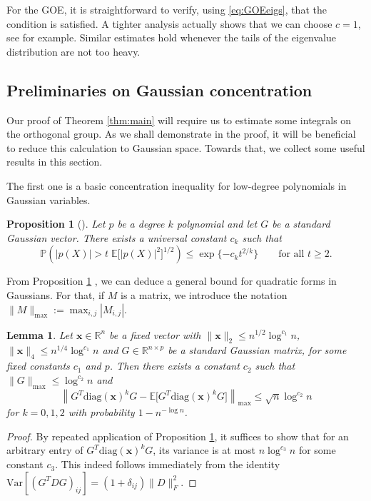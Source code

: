 \documentclass[reqno]{amsart}
\numberwithin{equation}{section}
\newcommand\E{\mathbb{E}}
\newtheorem{lemma}[theorem]{Lemma}
\newtheorem{proposition}[theorem]{Proposition}
\begin{document}
For the GOE, it is straightforward to verify, using \eqref{eq:GOEeigs}, that the condition is satisfied. A tighter analysis actually shows that we can choose $c = 1$, see \cite[Chapter 3.1]{anderson2010introduction} for example. Similar estimates hold whenever the tails of the eigenvalue distribution are not too heavy.
\subsection{Preliminaries on Gaussian concentration}
Our proof of Theorem \ref{thm:main} will require us to estimate some integrals on the orthogonal group. As we shall demonstrate in the proof, it will be beneficial to reduce this calculation to Gaussian space. Towards that, we collect some useful results in this section.

The first one is a basic concentration inequality for low-degree polynomials in Gaussian variables.
\begin{proposition}[{\cite[Theorem 6.7]{janson1997gaussian}}]\label{prop:gaussian_concentration}
Let $p$ be a degree $k$ polynomial and let $G$ be a standard Gaussian vector. There exists a universal constant $c_k$ such that
\[ \mathbb{P} \left( |p(X)| > t \; \E \big[ |p(X)|^2\big]^{1/2} \right) \le \exp\{-c_k t^{2/k} \} \qquad \text{for all } t \ge 2.\] 
\end{proposition}
From Proposition \ref{prop:gaussian_concentration} , we can deduce a general bound for quadratic forms in Gaussians. For that, if $M$ is a matrix, we introduce the notation $\|M\|_{\max}:= \max_{i,j}|M_{i,j}|$.
\begin{lemma}\label{lm:typical}
Let $\bm{x} \in \mathbb{R}^{n}$ be a fixed vector with $\|\bm{x}\|_2 \le n^{1/2} \log^{c_1} n$, $\|\bm{x}\|_4 \le n^{1/4} \log^{c_1} n$ and $G \in \mathbb{R}^{n \times p}$ be a standard Gaussian matrix, for some fixed constants $c_1$ and $p$. Then there exists a constant $c_2$ such that $\|G\|_{\max} \le \log^{c_2} n$ and
\[\left\| G^T \mathrm{diag}(\bm{x})^k G - \E\big[ G^T \mathrm{diag}(\bm{x})^k G \big] \right\|_{\max} \le \sqrt{n} \log^{c_2} n\]
for $k = 0,1,2$ with probability $1 - n^{-\log n}$.
\end{lemma}
\begin{proof}
By repeated application of Proposition \ref{prop:gaussian_concentration}, it suffices to show that for an arbitrary entry of $G^T \mathrm{diag}(\bm{x})^k G$, its variance is at most $n \log^{c_3} n$ for some constant $c_3$. This indeed follows immediately from the identity $\mathrm{Var}[(G^T D G)_{ij}]= (1+ \delta_{ij})\|D\|_F^2$. 
\end{proof}
\end{document}
